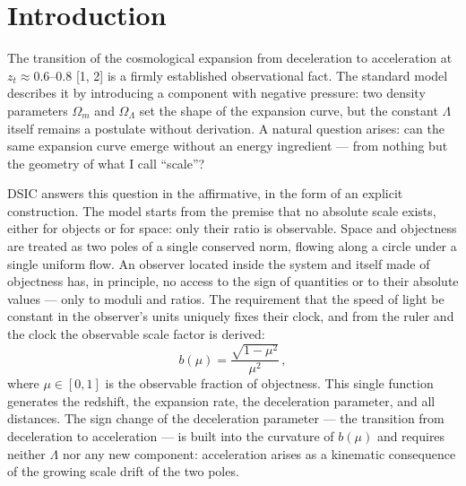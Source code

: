 \documentclass{article}
\begin{document}
\begin{abstract}
The early Universe is delegated to the \textbf{second tier} of the model (Part II): the form of the correction to the light path is derived from an additional postulate on the binding of objects, and the single threshold $\mu_d \approx 0.9806$ ($z \approx 4.5$) is calibrated against a single observation --- the distance to the last-scattering surface; the status of this superstructure --- a calibration with the form fixed by the postulate, not a prediction --- is stated explicitly. Structure growth is not derived from the core; the model's background has been checked for compatibility with the standard (GR-limit) growth of linear perturbations: on the $f\sigma_8$ compilation (``Gold-2017'' [13, 14]) one recovers $S_8 \approx 0.76$, statistically indistinguishable from $\Lambda$CDM (\S12); deriving growth from binding remains a direction for development. All empirical claims are reproducible with scripts from the open repository.
\end{abstract}
\newpage
\section{Introduction}

The transition of the cosmological expansion from deceleration to acceleration at $z_t \approx 0.6\text{--}0.8$ [1, 2] is a firmly established observational fact. The standard model describes it by introducing a component with negative pressure: two density parameters $\Omega_m$ and $\Omega_\Lambda$ set the shape of the expansion curve, but the constant $\Lambda$ itself remains a postulate without derivation. A natural question arises: can the same expansion curve emerge without an energy ingredient --- from nothing but the geometry of what I call ``scale''?

DSIC answers this question in the affirmative, in the form of an explicit construction. The model starts from the premise that no absolute scale exists, either for objects or for space: only their ratio is observable. Space and objectness are treated as two poles of a single conserved norm, flowing along a circle under a single uniform flow. An observer located inside the system and itself made of objectness has, in principle, no access to the sign of quantities or to their absolute values --- only to moduli and ratios. The requirement that the speed of light be constant in the observer's units uniquely fixes their clock, and from the ruler and the clock the observable scale factor is derived:
\begin{equation}
b(\mu) = \frac{\sqrt{1 - \mu^2}}{\mu^2}\,,
\end{equation}
where $\mu \in [0, 1]$ is the observable fraction of objectness. This single function generates the redshift, the expansion rate, the deceleration parameter, and all distances. The sign change of the deceleration parameter --- the transition from deceleration to acceleration --- is built into the curvature of $b(\mu)$ and requires neither $\Lambda$ nor any new component: acceleration arises as a kinematic consequence of the growing scale drift of the two poles.
\end{document}
